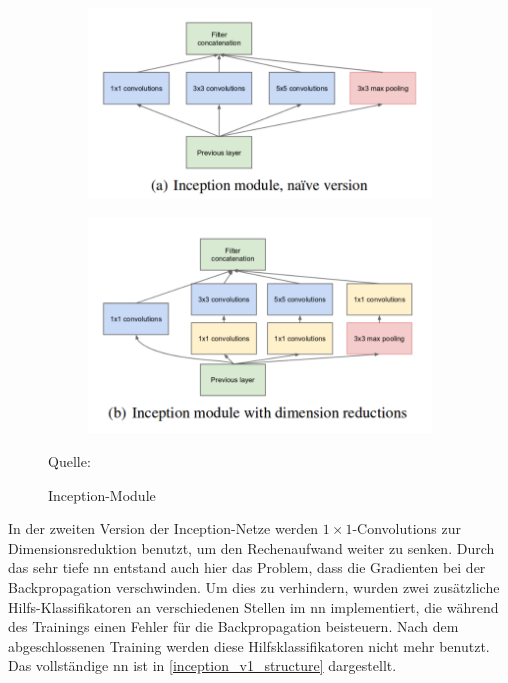 \documentclass[twoside, 12pt,a4paper]{book}
\newcommand{\source}[1]{\caption*{\hfill Quelle: {#1}} }
\numberwithin{equation}{section}
\begin{document}
	
	
	\begin{figure}
		\centering
		\begin{subfigure}{.5\textwidth}
			\centering
				\includegraphics[width=.7\linewidth]{inception_module_naive.png}
			
		\end{subfigure}%
		\begin{subfigure}{.5\textwidth}
			\centering
			\includegraphics[width=.7\linewidth]{inception_module_advanced.png}
			
		\end{subfigure}
		\caption{Inception-Module}
		\source{\cite{goingdeeperwithconvolutions}}
		
		\label{inception_modules}
	\end{figure}


	\noindent In der zweiten Version der Inception-Netze werden $1\times 1$-Convolutions zur Dimensionsreduktion benutzt, um den Rechenaufwand weiter zu senken.
	Durch das sehr tiefe \ac{nn} entstand auch hier das Problem, dass die Gradienten bei der Backpropagation verschwinden. Um dies zu verhindern, wurden zwei zusätzliche Hilfs-Klassifikatoren an verschiedenen Stellen im \ac{nn} implementiert, die während des Trainings einen Fehler für die Backpropagation beisteuern. Nach dem abgeschlossenen Training werden diese Hilfsklassifikatoren nicht mehr benutzt. Das vollständige \ac{nn} ist in \autoref{inception_v1_structure} dargestellt.
	
\end{document}
